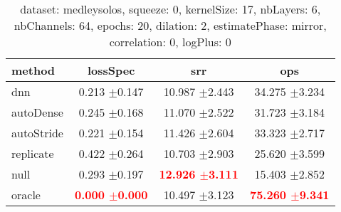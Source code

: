   
\begin{table} 
\begin{center} 
\ 
 \setlength{\tabcolsep}{.16667em} 
\begin{tabular}{lccc} 
method & lossSpec & srr & ops \\ 
\hline 
dnn & 0.213 $\pm$0.147 & 10.987 $\pm$2.443 & 34.275 $\pm$3.234 \\ 
autoDense & 0.245 $\pm$0.168 & 11.070 $\pm$2.522 & 31.723 $\pm$3.184 \\ 
autoStride & 0.221 $\pm$0.154 & 11.426 $\pm$2.604 & 33.323 $\pm$2.717 \\ 
replicate & 0.422 $\pm$0.264 & 10.703 $\pm$2.903 & 25.620 $\pm$3.599 \\ 
null & 0.293 $\pm$0.197 & \textbf{\textcolor{red}{12.926 $\pm$3.111}} & 15.403 $\pm$2.852 \\ 
oracle & \textbf{\textcolor{red}{0.000 $\pm$0.000}} & 10.497 $\pm$3.123 & \textbf{\textcolor{red}{75.260 $\pm$9.341}} \\ 
\end{tabular} 
\end{center} 
\caption{dataset: medleysolos, squeeze: 0, kernelSize: 17, nbLayers: 6, nbChannels: 64, epochs: 20, dilation: 2, estimatePhase: mirror, correlation: 0, logPlus: 0} 
\label{dameSq0Kesi17Nbla6Nbch64Ep20Di2EsphmiCo0Lopl0} 
\end{table} 
 
